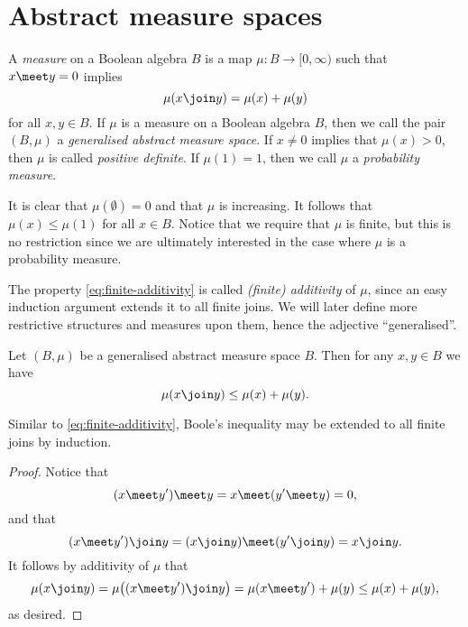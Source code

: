 \documentclass[article, a4paper, 11pt, oneside]{memoir}
\numberwithin{equation}{chapter}
\begin{document}
\section{Abstract measure spaces}

\begin{definition}
    A \emph{measure} on a Boolean algebra $B$ is a map $\mu \colon B \to [0,\infty)$ such that $x \meet y = 0$ implies
    \begin{equation}
        \label{eq:finite-additivity}
        \mu(x \join y)
            = \mu(x) + \mu(y)
    \end{equation}
    for all $x,y \in B$. If $\mu$ is a measure on a Boolean algebra $B$, then we call the pair $(B,\mu)$ a \emph{generalised abstract measure space}. If $x \neq 0$ implies that $\mu(x) > 0$, then $\mu$ is called \emph{positive definite}. If $\mu(1) = 1$, then we call $\mu$ a \emph{probability measure}.
\end{definition}
%
It is clear that $\mu(\emptyset) = 0$ and that $\mu$ is increasing. It follows that $\mu(x) \leq \mu(1)$ for all $x \in B$. Notice that we require that $\mu$ is finite, but this is no restriction since we are ultimately interested in the case where $\mu$ is a probability measure.

The property \cref{eq:finite-additivity} is called \emph{(finite) additivity} of $\mu$, since an easy induction argument extends it to all finite joins. We will later define more restrictive structures and measures upon them, hence the adjective \enquote{generalised}.

\begin{proposition}
    Let $(B,\mu)$ be a generalised abstract measure space $B$. Then for any $x,y \in B$ we have
    \begin{equation*}
        \mu(x \join y)
            \leq \mu(x) + \mu(y).
    \end{equation*}
\end{proposition}
%
Similar to \eqref{eq:finite-additivity}, Boole's inequality may be extended to all finite joins by induction.

\begin{proof}
    Notice that
    \begin{equation*}
        (x \meet y') \meet y = x \meet (y' \meet y) = 0,
    \end{equation*}
    and that
    \begin{equation*}
        (x \meet y') \join y = (x \join y) \meet (y' \join y) = x \join y.
    \end{equation*}
    It follows by additivity of $\mu$ that
    \begin{equation*}
        \mu(x \join y)
            = \mu \bigl( (x \meet y') \join y \bigr)
            = \mu(x \meet y') + \mu(y)
            \leq \mu(x) + \mu(y),
    \end{equation*}
    as desired.
\end{proof}
\end{document}
